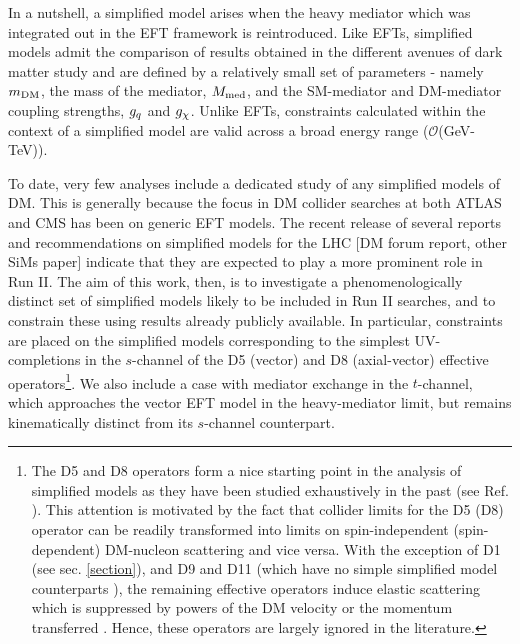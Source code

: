In a nutshell, a simplified model arises when the heavy mediator which was integrated out in the EFT framework is reintroduced. Like EFTs, simplified models admit the comparison of results obtained in the different avenues of dark matter study \cite{} and are defined by a relatively small set of parameters - namely $m_{\mathrm{DM}}$, the mass of the mediator, $M_{\mathrm{med}}$, and the SM-mediator and DM-mediator coupling strengths, $g_q$ and $g_{\chi}$. Unlike EFTs, constraints calculated within the context of a simplified model are valid across a broad energy range ($\mathcal{O}$(GeV-TeV)).

To date, very few analyses include a dedicated study of any simplified models of DM. This is generally because the focus in DM collider searches at both ATLAS and CMS has been on generic EFT models. The recent release of several reports and recommendations on simplified models for the LHC $[$DM forum report, other SiMs paper$]$ indicate that they are expected to play a more prominent role in Run II. The aim of this work, then, is to investigate a phenomenologically distinct set of simplified models likely to be included in Run II searches, and to constrain these using results already publicly available. In particular, constraints are placed on the simplified models corresponding to the simplest UV-completions in the $s$-channel of the D5 (vector) and D8 (axial-vector) effective operators\footnote{The D5 and D8 operators form a nice starting point in the analysis of simplified models as they have been studied exhaustively in the past (see Ref. \cite{}). This attention is motivated by the fact that collider limits for the D5 (D8) operator can be readily transformed into limits on spin-independent (spin-dependent) DM-nucleon scattering and vice versa. With the exception of D1 (see sec. \ref{section}), and D9 and D11 (which have no simple simplified model counterparts \cite{}), the remaining effective operators induce elastic scattering which is suppressed by powers of the DM velocity or the momentum transferred \cite{Kumar}. Hence, these operators are largely ignored in the literature.}. We also include a case with mediator exchange in the $t$-channel, which approaches the vector EFT model in the heavy-mediator limit, but remains kinematically distinct from its $s$-channel counterpart.

